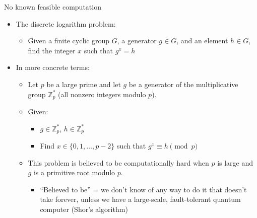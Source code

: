 \ifdefined\PRESENTATION\else\PassOptionsToClass{handout}{beamer}\fi\documentclass[aspectratio=169, lualatex]{beamer}
\begin{document}
\begin{frame}{No known feasible computation}
	\begin{itemize}[<+->]
		\item The discrete logarithm problem:
		      \begin{itemize}
			      \item Given a finite cyclic group $G$, a generator $g \in G$, and an element
			            $h \in G$, find the integer $x$ such that $g^{x}=h$
		      \end{itemize}
		\item In more concrete terms:
		      \begin{itemize}
			      \item Let $p$ be a large prime and let $g$ be a generator of the multiplicative
			            group $\mathbb{Z}_{p}^{*}$ (all nonzero integers modulo $p$).

			      \item Given:
			            \begin{itemize}
				            \item $g \in \mathbb{Z}_{p}^{*}$, $h \in \mathbb{Z}_{p}^{*}$

				            \item Find $x \in \{0, 1, \ldots, p-2\}$ such that $g^{x} \equiv h \pmod
					                  {p}$
			            \end{itemize}

			      \item This problem is believed to be computationally hard when $p$ is large
			            and $g$ is a primitive root modulo $p$.
			            \begin{itemize}
				            \item ``Believed to be'' = we don't know of any way to do it that doesn't
				                  take forever, unless we have a large-scale, fault-tolerant quantum computer (Shor's
				                  algorithm)
			            \end{itemize}
		      \end{itemize}
	\end{itemize}
\end{frame}
\end{document}
